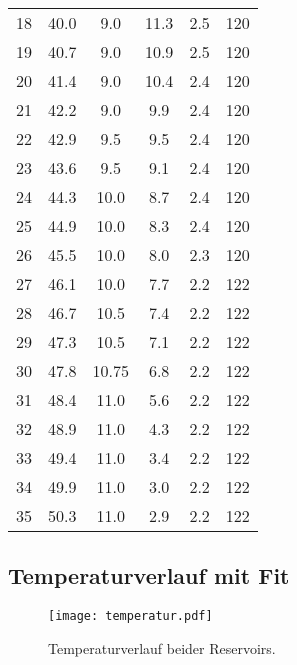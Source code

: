 \begin{table}
\begin{tabular}{S[table-format = 2.0] S[table-format = 2.1] S[table-format = 2.2] S[table-format = 2.1]
     S[table-format = 1.1] S[table-format = 3.0]}
    18	& 40.0 &	9.0    &	11.3 & 2.5 & 120 \\
    19	& 40.7 &	9.0    &	10.9 & 2.5 & 120 \\
    20	& 41.4 &	9.0    &	10.4 & 2.4 & 120 \\
    21	& 42.2 &	9.0    &	9.9	 & 2.4 & 120 \\
    22	& 42.9 &	9.5    &	9.5	 & 2.4 & 120 \\
    23	& 43.6 &	9.5    &	9.1	 & 2.4 & 120 \\
    24	& 44.3 &	10.0   &  8.7  & 2.4 & 120 \\
    25	& 44.9 &	10.0   &  8.3  & 2.4 & 120 \\
    26	& 45.5 &	10.0   &  8.0  & 2.3 & 120 \\
    27	& 46.1 &	10.0   &  7.7  & 2.2 & 122 \\
    28	& 46.7 &	10.5   &  7.4  & 2.2 & 122 \\
    29	& 47.3 &	10.5   &  7.1  & 2.2 & 122 \\
    30	& 47.8 &	10.75  &  6.8  & 2.2 & 122 \\
    31	& 48.4 &	11.0   &  5.6  & 2.2 & 122 \\
    32	& 48.9 &	11.0   &  4.3  & 2.2 & 122 \\
    33	& 49.4 &	11.0   &  3.4  & 2.2 & 122 \\
    34	& 49.9 &	11.0   &  3.0  & 2.2 & 122 \\
    35	& 50.3 &	11.0   &  2.9  & 2.2 & 122 \\
    \bottomrule 
  \end{tabular}
\end{table}
\subsection{Temperaturverlauf mit Fit}
\begin{figure}
  \centering
  \texttt{[image: temperatur.pdf]}
  \caption{Temperaturverlauf beider Reservoirs.}
  \label{fig:temperatur}
\end{figure}
